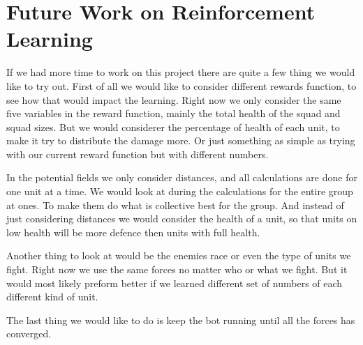 \section{Future Work on Reinforcement Learning}
%

If we had more time to work on this project there are quite a few thing we would like to try out. First of all we would like to consider different rewards function, to see how that would impact the learning. Right now we only consider the same five variables in the reward function, mainly the total health of the squad and squad sizes. But we would considerer the percentage of health of each unit, to make it try to distribute the damage more. Or just something as simple as trying with our current reward function but with different numbers. 

In the potential fields we only consider distances, and all calculations are done for one unit at a time. We would look at during the calculations for the entire group at ones. To make them do what is collective best for the group. And instead of just considering distances we would consider the health of a unit, so that units on low health will be more defence then units with full health.

Another thing to look at would be the enemies race or even the type of units we fight. Right now we use the same forces no matter who or what we fight. But it would most likely preform better if we learned different set of numbers of each different kind of unit.

The last thing we would like to do is keep the bot running until all the forces has converged.